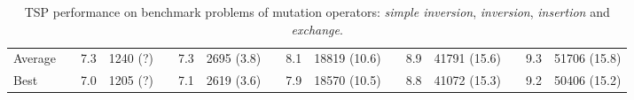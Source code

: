 \begin{sidewaystable}[hbpt]
{\begin{tabular} {l l S  l l S l l S l l S l l S l}
Average&&  7.3 & 1240 (?) && 7.3 & 2695 (3.8) && 8.1 & 18819  (10.6) &&  8.9 &   41791 (15.6) && 9.3 &  51706 (15.8)    \\
Best   && 7.0 & 1205 (?) && 7.1 & 2619 (3.6)  &&  7.9 & 18570  (10.5)&&  8.8 &  41072 (15.3) &&  9.2 &  50406 (15.2) \\    
\bottomrule
\end{tabular}}
\caption[TSP performance on benchmark problems of mutation operators.]{TSP performance on benchmark problems of mutation operators: \emph{simple inversion}, \emph{inversion}, \emph{insertion} and \emph{exchange}.}
\label{tab:mutation}
\end{sidewaystable}
















